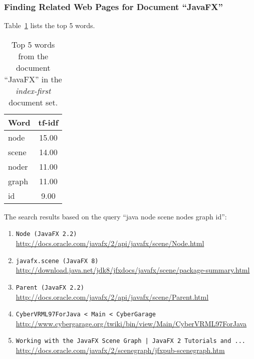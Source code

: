 \subsubsection{Finding Related Web Pages for Document ``JavaFX''}
\label{subsubsec:no-javafx-2}

Table~\ref{tab:topWords-no-javafx-2} lists the top 5 words.
\begin{table}[H]
\centering
\begin{tabular}{|l|c|}
\hline\hline
    Word & tf-idf \\
\hline
    node & 15.00 \\
    scene & 14.00 \\
    noder & 11.00 \\
    graph & 11.00 \\
    id & 9.00 \\
\hline\hline
\end{tabular}
\caption{Top 5 words from the document ``JavaFX'' in the \textit{index-first} document set.}
\label{tab:topWords-no-javafx-2}
\end{table}

The search results based on the query ``java node scene nodes graph id'':

\begin{enumerate}
\item
    \verb|Node (JavaFX 2.2)| \\
    \url{http://docs.oracle.com/javafx/2/api/javafx/scene/Node.html}
\item
    \verb|javafx.scene (JavaFX 8)| \\
    \url{http://download.java.net/jdk8/jfxdocs/javafx/scene/package-summary.html}
\item
    \verb|Parent (JavaFX 2.2)| \\
    \url{http://docs.oracle.com/javafx/2/api/javafx/scene/Parent.html}
\item
    \verb|CyberVRML97ForJava < Main < CyberGarage| \\
    \url{http://www.cybergarage.org/twiki/bin/view/Main/CyberVRML97ForJava}
\item
    \verb#Working with the JavaFX Scene Graph | JavaFX 2 Tutorials and ...# \\
    \url{http://docs.oracle.com/javafx/2/scenegraph/jfxpub-scenegraph.htm}
\end{enumerate}

